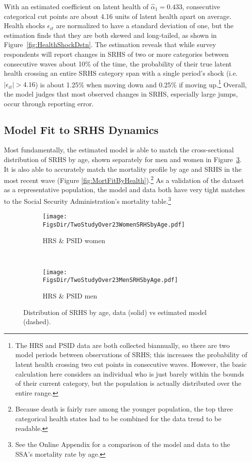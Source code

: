 \documentclass[12pt,pdftex,letterpaper]{article}
\newcommand{\LatentParam}{\alpha}
\newcommand{\HealthShock}{\epsilon}
\newcommand{\RootDir}{..}
\newcommand{\FigsDir}{\RootDir/Figures}
\begin{document}
With an estimated coefficient on latent health of $\hat{\LatentParam}_1 = 0.433$, consecutive categorical cut points are about 4.16 units of latent health apart on average. Health shocks $\HealthShock_{it}$ are normalized to have a standard deviation of one, but the estimation finds that they are both skewed and long-tailed, as shown in Figure~\ref{fig:HealthShockDstn}. The estimation reveals that while survey respondents will report changes in SRHS of two or more categories between consecutive waves about 10\% of the time, the probability of their true latent health crossing an entire SRHS category span with a single period's shock (i.e.\ $|\HealthShock_{it}| > 4.16$) is about 1.25\% when moving down and 0.25\% if moving up.\footnote{The HRS and PSID data are both collected biannually, so there are two model periods between observations of SRHS; this increases the probability of latent health crossing two cut points in consecutive waves. However, the basic calculation here considers an individual who is just barely within the bounds of their current category, but the population is actually distributed over the entire range.} Overall, the model judges that most observed changes in SRHS, especially large jumps, occur through reporting error.


\subsection{Model Fit to SRHS Dynamics}\label{sec:Fit}

Most fundamentally, the estimated model is able to match the cross-sectional distribution of SRHS by age, shown separately for men and women in Figure~\ref{fig:SRHSfitTwoStudy}. It is also able to accurately match the mortality profile by age and SRHS in the most recent wave (Figure \ref{fig:MortFitByHealth}).\footnote{Because death is fairly rare among the younger population, the top three categorical health states had to be combined for the data trend to be readable.} As a validation of the dataset as a representative population, the model and data both have very tight matches to the Social Security Administration's mortality table.\footnote{See the Online Appendix for a comparison of the model and data to the SSA's mortality rate by age.}

\begin{figure}
	\centering
	\begin{subfigure}[b]{0.48\textwidth}
		\texttt{[image: \\FigsDir/TwoStudyOver23WomenSRHSbyAge.pdf]}
		\caption{HRS \& PSID women}\label{fig:TwoStudyWomenSRHSfit}
	\end{subfigure}
	~
	\begin{subfigure}[b]{0.48\textwidth}
		\texttt{[image: \\FigsDir/TwoStudyOver23MenSRHSbyAge.pdf]}
		\caption{HRS \& PSID men}\label{fig:TwoStudyMenSRHSfit}
	\end{subfigure}
	\caption{Distribution of SRHS by age, data (solid) vs estimated model (dashed).}\label{fig:SRHSfitTwoStudy}
\end{figure}
\end{document}
